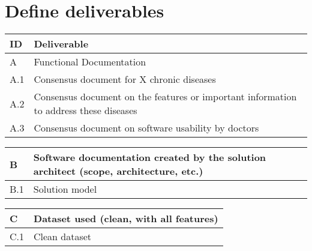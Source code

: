 \section{Define deliverables}\label{sec:define-deliverables}
\begin{center}
    \renewcommand{\arraystretch}{1.2} %
    \setlength{\tabcolsep}{10pt} %
    \begin{tabular}{| >{\raggedright\arraybackslash}p{1cm} |  >{\raggedright\arraybackslash}p{13cm} |}
        \hline
        \textbf{ID}               & \textbf{Deliverable}                                                                  \\ \hline
        \rowcolor[HTML]{DCDCDC} A & Functional Documentation                                                              \\ \hline
        A.1                       & Consensus document for X chronic diseases                                             \\ \hline
        A.2                       & Consensus document on the features or important information to address these diseases \\ \hline
        A.3                       & Consensus document on software usability by doctors                                   \\ \hline
    \end{tabular}

    \vspace{1em}
    \begin{tabular}{| >{\raggedright\arraybackslash}p{1cm}  | >{\raggedright\arraybackslash}p{13cm} |}
        \hline
        \rowcolor[HTML]{DCDCDC} B & Software documentation created by the solution architect (scope, architecture, etc.) \\ \hline
        B.1                       & Solution model                                                                       \\ \hline
    \end{tabular}

    \vspace{1em}
    \begin{tabular}{| >{\raggedright\arraybackslash}p{1cm}  | >{\raggedright\arraybackslash}p{13cm} |}
        \hline
        \rowcolor[HTML]{DCDCDC} C & Dataset used (clean, with all features) \\ \hline
        C.1                       & Clean dataset                           \\ \hline
    \end{tabular}


\end{center}
